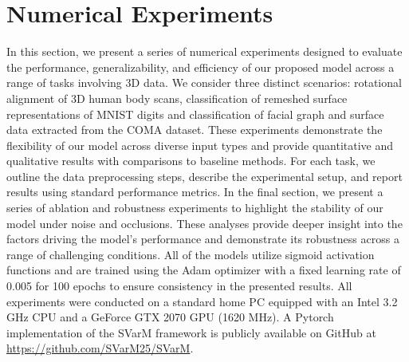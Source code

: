 \documentclass[11pt]{article}
\begin{document}
\section{Numerical Experiments}\label{sec:numerical}
In this section, we present a series of numerical experiments designed to evaluate the performance, generalizability, and efficiency of our proposed model across a range of tasks involving 3D data. We consider three distinct scenarios: rotational alignment of 3D human body scans, classification of remeshed surface representations of MNIST digits and classification of facial graph and surface data extracted from the COMA dataset. These experiments demonstrate the flexibility of our model across diverse input types and provide quantitative and qualitative results with comparisons to baseline methods. For each task, we outline the data preprocessing steps, describe the experimental setup, and report results using standard performance metrics. In the final section, we present a series of ablation and robustness experiments to highlight the stability of our model under noise and occlusions. These analyses provide deeper insight into the factors driving the model’s performance and demonstrate its robustness across a range of challenging conditions. All of the models utilize sigmoid activation functions and are trained using the Adam optimizer with a fixed learning rate of 0.005 for 100 epochs to ensure consistency in the presented results. All experiments were conducted on a standard home PC equipped with an Intel 3.2 GHz CPU and a GeForce GTX 2070 GPU (1620 MHz). A Pytorch implementation of the SVarM framework is publicly available on GitHub at \url{https://github.com/SVarM25/SVarM}.
\end{document}
